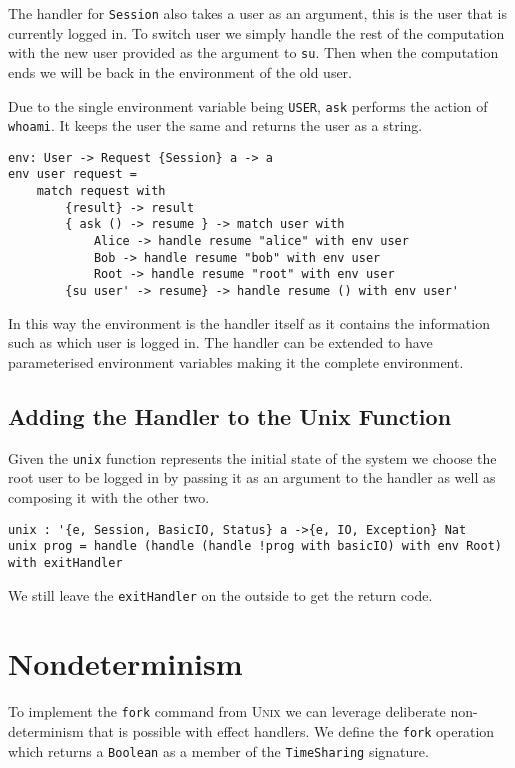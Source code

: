 \documentclass[logo,bsc,singlespacing,parskip]{infthesis}
\begin{document}
The handler for \texttt{Session} also takes a user as an argument, this is the
user that is currently logged in. To switch user we simply handle the rest of
the computation with the new user provided as the argument to \texttt{su}. Then
when the computation ends we will be back in the environment of the old user.

Due to the single environment variable being \texttt{USER}, \texttt{ask}
performs the action of \texttt{whoami}. It keeps the user the same and returns
the user as a string.

\begin{lstlisting}[language=unison]
env: User -> Request {Session} a -> a
env user request = 
    match request with
        {result} -> result
        { ask () -> resume } -> match user with 
            Alice -> handle resume "alice" with env user
            Bob -> handle resume "bob" with env user
            Root -> handle resume "root" with env user
        {su user' -> resume} -> handle resume () with env user'
\end{lstlisting}

In this way the environment is the handler itself as it contains the
information such as which user is logged in. The handler can be extended to
have parameterised environment variables making it the complete environment.

\subsection{Adding the Handler to the Unix Function}

Given the \texttt{unix} function represents the initial state of the system we
choose the root user to be logged in by passing it as an argument to the
handler as well as composing it with the other two.

\begin{lstlisting}[language=unison]
unix : '{e, Session, BasicIO, Status} a ->{e, IO, Exception} Nat
unix prog = handle (handle (handle !prog with basicIO) with env Root) with exitHandler
\end{lstlisting}

We still leave the \texttt{exitHandler} on the outside to get the return code.

\section{Nondeterminism}

To implement the \texttt{fork} command from \textsc{Unix} we can leverage
deliberate non-determinism that is possible with effect handlers. We define the
\texttt{fork} operation which returns a \texttt{Boolean} as a member of the
\texttt{TimeSharing} signature.
\end{document}

